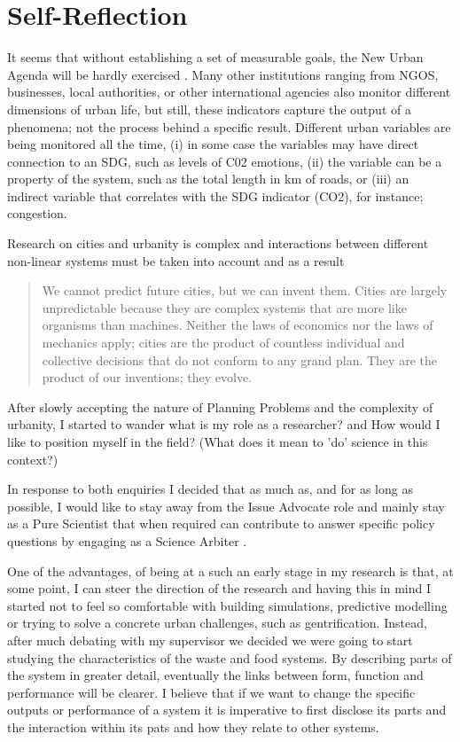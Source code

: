 \chapter{Self-Reflection}


It seems that without establishing a set of measurable goals, the New Urban Agenda will be hardly exercised \cite{Caprotti2017, Valencia2018}. Many other institutions ranging from NGOS, businesses, local authorities, or other international agencies also monitor different dimensions of urban life, but still, these indicators capture the output of a phenomena; not the process behind a specific result. Different urban variables are being monitored all the time, (i) in some case the variables may have direct connection to an SDG, such as levels of C02 emotions, (ii) the variable can be a property of the system, such as the total length in km of roads, or (iii) an indirect variable that correlates with the SDG indicator (CO2), for instance; congestion.  \par


Research on cities and urbanity is complex and interactions between different non-linear systems must be taken into account and as a result 
\begin{quote}We cannot predict future cities, but we can invent them. Cities are largely unpredictable because they are complex systems that are more like organisms than machines. Neither the laws of economics nor the laws of mechanics apply; cities are the product of countless individual and collective decisions that do not conform to any grand plan. They are the product of our inventions; they evolve. \parencite{Batty2013}\end{quote} 

After slowly accepting the nature of Planning Problems and the complexity of urbanity, I started to wander what is my role  as a researcher? and How would I like to position myself in the field? (What does it mean to 'do' science in this context?) \par 
In response to both enquiries I decided that as much as, and for as long as possible, I would like to stay away from the Issue Advocate role and mainly stay as a Pure Scientist that when required can contribute to answer specific policy questions by engaging as a Science Arbiter \cite{Brown2008}. \par
One of the advantages, of being at a such an early stage in my research is that, at some point, I can steer the direction of the research and having this in mind I started not to feel so comfortable with building simulations, predictive modelling or trying to solve a concrete urban challenges, such as gentrification. Instead, after much debating with my supervisor we decided we were going to start studying the characteristics of the waste and food systems. By describing parts of the system in greater detail, eventually the links between form, function and performance will be clearer. I believe that if we want to change the specific outputs or performance of a system it is imperative to first disclose its parts and the interaction within its pats and how they relate to other systems.  \par

